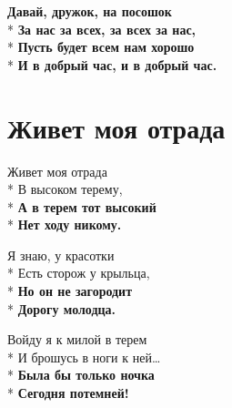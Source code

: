 \medskip

\begin{minipage}{\linewidth}
\hspace*{1.5em}\textbf{Давай, дружок, на посошок}\\*
\hspace*{1.5em}\textbf{За нас за всех, за всех за нас,}\\*
\hspace*{1.5em}\textbf{Пусть будет всем нам хорошо}\\*
\hspace*{1.5em}\textbf{И в добрый час, и в добрый час.}\\
\end{minipage}

\vspace{\fill}\newpage

\section{Живет моя отрада}
\label{song:Живет_моя_отрада}

\medskip

\begin{minipage}{\linewidth}
Живет моя отрада\\*
В высоком терему,\\*
\textbf{А в терем тот высокий}\\*
\textbf{Нет ходу никому.}\\
\end{minipage}\par\medskip\nobreak

\medskip

\begin{minipage}{\linewidth}
Я знаю, у красотки\\*
Есть сторож у крыльца,\\*
\textbf{Но он не загородит}\\*
\textbf{Дорогу молодца.}\\
\end{minipage}\par\medskip\nobreak

\medskip

\begin{minipage}{\linewidth}
Войду я к милой в терем\\*
И брошусь в ноги к ней…\\*
\textbf{Была бы только ночка}\\*
\textbf{Сегодня потемней!}\\
\end{minipage}\par\medskip\nobreak

